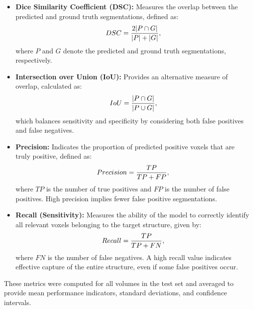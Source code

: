 \begin{itemize}
    \item \textbf{Dice Similarity Coefficient (DSC):} Measures the overlap between the predicted and ground truth segmentations, defined as:
    \begin{equation}
    \addcontentsline{equ}{equations}{\protect\numberline{\theequation}Dice Coefficient}
    DSC = \frac{2|P \cap G|}{|P| + |G|},
    \end{equation}
    where $P$ and $G$ denote the predicted and ground truth segmentations, respectively.
    
    \item \textbf{Intersection over Union (IoU):} Provides an alternative measure of overlap, calculated as:
    \begin{equation}
        \addcontentsline{equ}{equations}{\protect\numberline{\theequation}Intersection over Union (IoU)}
    IoU = \frac{|P \cap G|}{|P \cup G|},
    \end{equation}
    which balances sensitivity and specificity by considering both false positives and false negatives.
    
    \item \textbf{Precision:} Indicates the proportion of predicted positive voxels that are truly positive, defined as:
    \begin{equation}
        \addcontentsline{equ}{equations}{\protect\numberline{\theequation}Precision}
    Precision = \frac{TP}{TP + FP},
    \end{equation}
    where $TP$ is the number of true positives and $FP$ is the number of false positives. High precision implies fewer false positive segmentations.
    
    \item \textbf{Recall (Sensitivity):} Measures the ability of the model to correctly identify all relevant voxels belonging to the target structure, given by:
    \begin{equation}
        \addcontentsline{equ}{equations}{\protect\numberline{\theequation}Recall}
    Recall = \frac{TP}{TP + FN},
    \end{equation}
    where $FN$ is the number of false negatives. A high recall value indicates effective capture of the entire structure, even if some false positives occur.
    \end{itemize}
    
These metrics were computed for all volumes in the test set and averaged to provide mean performance indicators, standard deviations, and confidence intervals.

